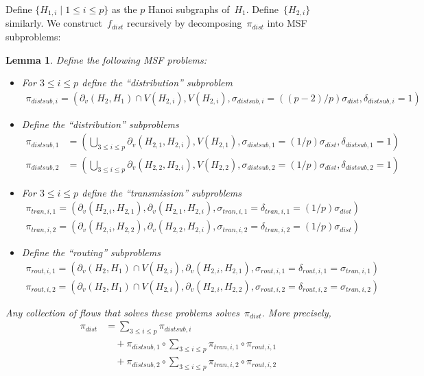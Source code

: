 \documentclass[
final
]{dmtcs-episciences}
\newcommand{\bdryh}[2]{\partial_v(#1,#2)}
\newtheorem{lemma}[theorem]{Lemma}
\begin{document}
Define $\{H_{1,i} \mid 1 \leq i \leq p\}$ as the $p$ Hanoi subgraphs of~$H_1$. Define~$\{H_{2,i}\}$ similarly. 
We construct~$f_{dist}$ recursively by decomposing~$\pi_{dist}$ into MSF subproblems:
\begin{lemma}
\label{lem:fdistrecdef}
Define the following MSF problems:
\begin{itemize}
    \item For $3 \leq i \leq p$ define the ``distribution'' subproblem \begin{align*}
        \pi_{distsub,i} = \left(\bdryh{H_2}{H_1} \cap V(H_{2,i}), V(H_{2,i}), \sigma_{distsub,i} = ((p-2)/p)\sigma_{dist}, \delta_{distsub,i} = 1\right)
    \end{align*}

    \item Define the ``distribution'' subproblems
    \begin{align*}
        \pi_{distsub,1} &= \left( \bigcup_{3 \leq i\leq p}\bdryh{H_{2,1}}{H_{2,i}}, V(H_{2,1}), \sigma_{distsub,1} = (1/p)\sigma_{dist}, \delta_{distsub,1} = 1\right) \\
        \pi_{distsub,2} &= \left(\bigcup_{3 \leq i\leq p}\bdryh{H_{2,2}}{H_{2,i}}, V(H_{2,2}), \sigma_{distsub,2} = (1/p)\sigma_{dist}, \delta_{distsub,2} = 1\right)
    \end{align*}
 
    
    \item For $3 \leq i \leq p$ define the ``transmission'' subproblems
    \begin{align*}
        \pi_{tran,i,1} = (\bdryh{H_{2,i}}{H_{2,1}}, \bdryh{H_{2,1}}{H_{2,i}}, \sigma_{tran,i,1} = \delta_{tran,i,1} = (1/p)\sigma_{dist}) \\
        \pi_{tran,i,2} = (\bdryh{H_{2,i}}{H_{2,2}}, \bdryh{H_{2,2}}{H_{2,i}}, \sigma_{tran,i,2} = \delta_{tran,i,2} = (1/p)\sigma_{dist})
    \end{align*}
    
    \item Define the ``routing'' subproblems
    \begin{align*}
        \pi_{rout,i,1} = (\bdryh{H_2}{H_{1}} \cap V(H_{2,i}), \bdryh{H_{2,i}}{H_{2,1}}, \sigma_{rout,i,1} = \delta_{rout,i,1} = \sigma_{tran,i,1}) \\
        \pi_{rout,i,2} = (\bdryh{H_2}{H_{1}} \cap V(H_{2,i}), \bdryh{H_{2,i}}{H_{2,2}}, \sigma_{rout,i,2} = \delta_{rout,i,2} = \sigma_{tran,i,2})
    \end{align*}

\end{itemize}
Any collection of flows that solves these problems solves~$\pi_{dist}$. More precisely,
\begin{align*}
    \pi_{dist} &= \sum_{3\leq i \leq p} \pi_{distsub,i} \\
    &\quad + \pi_{distsub,1} \circ \sum_{3\leq i \leq p} \pi_{tran,i,1} \circ \pi_{rout,i,1} \\
    &\quad + \pi_{distsub,2} \circ \sum_{3\leq i \leq p} \pi_{tran,i,2} \circ \pi_{rout,i,2}
\end{align*}
\end{lemma}
\end{document}
